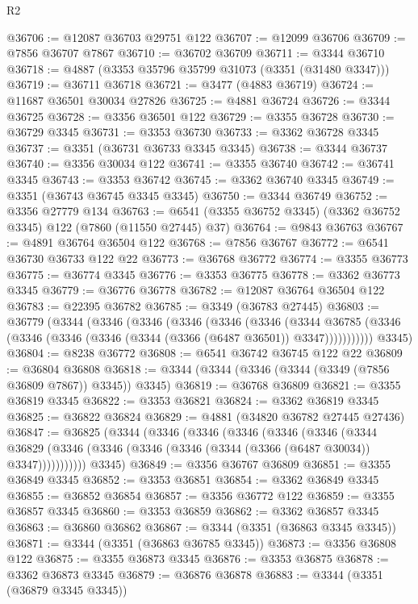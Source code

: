 \begin{lexlean}{R2}
\begin{coremodule}
@36706 := @12087 @36703 @29751 @122
@36707 := @12099 @36706
@36709 := @7856 @36707 @7867
@36710 := @36702 @36709
@36711 := @3344 @36710
@36718 := @4887 (@3353 @35796 @35799 @31073 (@3351 (@31480 @3347)))
@36719 := @36711 @36718
@36721 := @3477 (@4883 @36719)
@36724 := @11687 @36501 @30034 @27826
@36725 := @4881 @36724
@36726 := @3344 @36725
@36728 := @3356 @36501 @122
@36729 := @3355 @36728
@36730 := @36729 @3345
@36731 := @3353 @36730
@36733 := @3362 @36728 @3345
@36737 := @3351 (@36731 @36733 @3345 @3345)
@36738 := @3344 @36737
@36740 := @3356 @30034 @122
@36741 := @3355 @36740
@36742 := @36741 @3345
@36743 := @3353 @36742
@36745 := @3362 @36740 @3345
@36749 := @3351 (@36743 @36745 @3345 @3345)
@36750 := @3344 @36749
@36752 := @3356 @27779 @134
@36763 := @6541 (@3355 @36752 @3345) (@3362 @36752 @3345) @122 (@7860 (@11550 @27445) @37)
@36764 := @9843 @36763
@36767 := @4891 @36764 @36504 @122
@36768 := @7856 @36767
@36772 := @6541 @36730 @36733 @122 @22
@36773 := @36768 @36772
@36774 := @3355 @36773
@36775 := @36774 @3345
@36776 := @3353 @36775
@36778 := @3362 @36773 @3345
@36779 := @36776 @36778
@36782 := @12087 @36764 @36504 @122
@36783 := @22395 @36782
@36785 := @3349 (@36783 @27445)
@36803 := @36779
    (@3344
      (@3346
        (@3346
          (@3346
            (@3346
              (@3346
                (@3344
                  @36785
                  (@3346 (@3346 (@3346 (@3346 (@3344 (@3366 (@6487 @36501)) @3347)))))))))))
      @3345)
@36804 := @8238 @36772
@36808 := @6541 @36742 @36745 @122 @22
@36809 := @36804 @36808
@36818 := @3344 (@3344 (@3346 (@3344 (@3349 (@7856 @36809 @7867)) @3345)) @3345)
@36819 := @36768 @36809
@36821 := @3355 @36819 @3345
@36822 := @3353 @36821
@36824 := @3362 @36819 @3345
@36825 := @36822 @36824
@36829 := @4881 (@34820 @36782 @27445 @27436)
@36847 := @36825
    (@3344
      (@3346
        (@3346
          (@3346
            (@3346
              (@3346
                (@3344
                  @36829
                  (@3346 (@3346 (@3346 (@3346 (@3344 (@3366 (@6487 @30034)) @3347)))))))))))
      @3345)
@36849 := @3356 @36767 @36809
@36851 := @3355 @36849 @3345
@36852 := @3353 @36851
@36854 := @3362 @36849 @3345
@36855 := @36852 @36854
@36857 := @3356 @36772 @122
@36859 := @3355 @36857 @3345
@36860 := @3353 @36859
@36862 := @3362 @36857 @3345
@36863 := @36860 @36862
@36867 := @3344 (@3351 (@36863 @3345 @3345))
@36871 := @3344 (@3351 (@36863 @36785 @3345))
@36873 := @3356 @36808 @122
@36875 := @3355 @36873 @3345
@36876 := @3353 @36875
@36878 := @3362 @36873 @3345
@36879 := @36876 @36878
@36883 := @3344 (@3351 (@36879 @3345 @3345))

\end{coremodule}
\end{lexlean}
